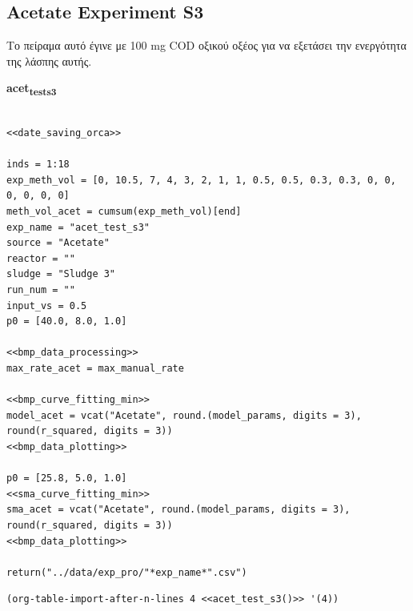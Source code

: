\documentclass[11pt]{article}
\begin{document}
\subsection{Acetate Experiment S3}
\label{sec:orgbef4ff7}
Το πείραμα αυτό έγινε με 100 mg COD οξικού οξέος για να εξετάσει την ενεργότητα της λάσπης αυτής.

\textbf{acet\textsubscript{test}\textsubscript{s3}}
\begin{verbatim}

<<date_saving_orca>>

inds = 1:18
exp_meth_vol = [0, 10.5, 7, 4, 3, 2, 1, 1, 0.5, 0.5, 0.3, 0.3, 0, 0, 0, 0, 0, 0] 
meth_vol_acet = cumsum(exp_meth_vol)[end]
exp_name = "acet_test_s3"
source = "Acetate"
reactor = ""
sludge = "Sludge 3"
run_num = ""
input_vs = 0.5
p0 = [40.0, 8.0, 1.0]

<<bmp_data_processing>>
max_rate_acet = max_manual_rate

<<bmp_curve_fitting_min>>
model_acet = vcat("Acetate", round.(model_params, digits = 3), round(r_squared, digits = 3))
<<bmp_data_plotting>>

p0 = [25.8, 5.0, 1.0]
<<sma_curve_fitting_min>>
sma_acet = vcat("Acetate", round.(model_params, digits = 3), round(r_squared, digits = 3))
<<bmp_data_plotting>>

return("../data/exp_pro/"*exp_name*".csv")

\end{verbatim}

\begin{verbatim}
(org-table-import-after-n-lines 4 <<acet_test_s3()>> '(4))
\end{verbatim}
\end{document}
